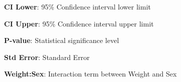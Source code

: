 \documentclass[11pt]{article}
\begin{document}
\begin{table}[h]
\caption{\protect\hyperlink{file-table-1-pkl}{Linear regression model with interaction between weight and sex predicting OTTD.}}
\label{table:linear_regression_model}
\begin{threeparttable}
\renewcommand{\TPTminimum}{\linewidth}
\begin{tablenotes}
\footnotesize
\item \textbf{CI Lower}: 95\% Confidence interval lower limit
\item \textbf{CI Upper}: 95\% Confidence interval upper limit
\item \textbf{P-value}: Statistical significance level
\item \textbf{Std Error}: Standard Error
\item \textbf{Weight:Sex}: Interaction term between Weight and Sex
\end{tablenotes}
\end{threeparttable}
\end{table}
\end{document}
